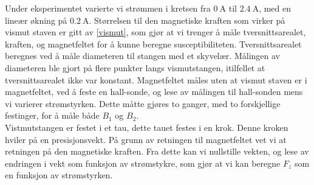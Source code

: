 \documentclass[%
 reprint,
 amsmath,amssymb,
 aps,
]{revtex4-1}
\begin{document}
Under eksperimentet varierte vi strømmen i kretsen fra $\SI{0}{\ampere}$ til $\SI{2.4}{\ampere}$, med en lineær økning på $\SI{0.2}{\ampere}$. Størrelsen til den magnetiske kraften som virker på vismut staven er gitt av \eqref{vismut}, som gjør at vi trenger å måle tversnittsarealet, kraften, og magnetfeltet for å kunne beregne susceptibiliteten. Tversnittsarealet beregnes ved å måle diameteren til stangen med et skyvelær. Målingen av diameteren ble gjort på flere punkter langs vismutstangen, itilfellet at tversnittsarealet ikke var konstant. Magnetfeltet måles uten at vismut staven er i magnetfeltet, ved å feste en hall-sonde, og lese av målingen til hall-sonden mens vi varierer strømstyrken. Dette måtte gjøres to ganger, med to forskjellige festinger, for å måle både $B_1$ og $B_2$. \\
Vistmutstangen er festet i et tau, dette tauet festes i en krok. Denne kroken hviler på en presisjonsvekt. På grunn av retningen til magnetfeltet vet vi at retningen på den magnetiske kraften. Fra dette kan vi nullstille vekten, og lese av endringen i vekt som funksjon av strømstykre, som gjør at vi kan beregne $F_z$ som en funksjon av strømstyrken.
\end{document}
